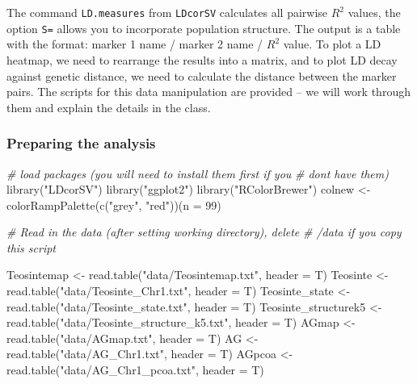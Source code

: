 \documentclass[
]{book}
\newenvironment{Shaded}{\begin{snugshade}}{\end{snugshade}}
\newcommand{\AttributeTok}[1]{\textcolor[rgb]{0.77,0.63,0.00}{#1}}
\newcommand{\CommentTok}[1]{\textcolor[rgb]{0.56,0.35,0.01}{\textit{#1}}}
\newcommand{\DecValTok}[1]{\textcolor[rgb]{0.00,0.00,0.81}{#1}}
\newcommand{\FunctionTok}[1]{\textcolor[rgb]{0.00,0.00,0.00}{#1}}
\newcommand{\NormalTok}[1]{#1}
\newcommand{\OtherTok}[1]{\textcolor[rgb]{0.56,0.35,0.01}{#1}}
\newcommand{\StringTok}[1]{\textcolor[rgb]{0.31,0.60,0.02}{#1}}
\begin{document}
The command \texttt{LD.measures} from \texttt{LDcorSV} calculates all pairwise \(R^2\) values, the option \texttt{S=} allows you to incorporate population structure. The output is a table with the format: marker 1 name / marker 2 name / \(R^2\) value. To plot a LD heatmap, we need to rearrange the results into a matrix, and to plot LD decay against genetic distance, we need to calculate the distance between the marker pairs. The scripts for this data manipulation are provided -- we will work through them and explain the details in the class.

\hypertarget{preparing-the-analysis}{%
\subsubsection{Preparing the analysis}\label{preparing-the-analysis}}

\begin{Shaded}
\begin{Highlighting}[]
\CommentTok{\# load packages (you will need to install them first if you}
\CommentTok{\# don\textquotesingle{}t have them)}
\FunctionTok{library}\NormalTok{(}\StringTok{"LDcorSV"}\NormalTok{)}
\FunctionTok{library}\NormalTok{(}\StringTok{"ggplot2"}\NormalTok{)}
\FunctionTok{library}\NormalTok{(}\StringTok{"RColorBrewer"}\NormalTok{)}
\NormalTok{colnew }\OtherTok{\textless{}{-}} \FunctionTok{colorRampPalette}\NormalTok{(}\FunctionTok{c}\NormalTok{(}\StringTok{"grey"}\NormalTok{, }\StringTok{"red"}\NormalTok{))(}\AttributeTok{n =} \DecValTok{99}\NormalTok{)}

\CommentTok{\# Read in the data (after setting working directory), delete}
\CommentTok{\# \textquotesingle{}/data\textquotesingle{} if you copy this script}

\NormalTok{Teosintemap }\OtherTok{\textless{}{-}} \FunctionTok{read.table}\NormalTok{(}\StringTok{"data/Teosintemap.txt"}\NormalTok{, }\AttributeTok{header =}\NormalTok{ T)}
\NormalTok{Teosinte }\OtherTok{\textless{}{-}} \FunctionTok{read.table}\NormalTok{(}\StringTok{"data/Teosinte\_Chr1.txt"}\NormalTok{, }\AttributeTok{header =}\NormalTok{ T)}
\NormalTok{Teosinte\_state }\OtherTok{\textless{}{-}} \FunctionTok{read.table}\NormalTok{(}\StringTok{"data/Teosinte\_state.txt"}\NormalTok{, }\AttributeTok{header =}\NormalTok{ T)}
\NormalTok{Teosinte\_structurek5 }\OtherTok{\textless{}{-}} \FunctionTok{read.table}\NormalTok{(}\StringTok{"data/Teosinte\_structure\_k5.txt"}\NormalTok{, }
    \AttributeTok{header =}\NormalTok{ T)}
\NormalTok{AGmap }\OtherTok{\textless{}{-}} \FunctionTok{read.table}\NormalTok{(}\StringTok{"data/AGmap.txt"}\NormalTok{, }\AttributeTok{header =}\NormalTok{ T)}
\NormalTok{AG }\OtherTok{\textless{}{-}} \FunctionTok{read.table}\NormalTok{(}\StringTok{"data/AG\_Chr1.txt"}\NormalTok{, }\AttributeTok{header =}\NormalTok{ T)}
\NormalTok{AGpcoa }\OtherTok{\textless{}{-}} \FunctionTok{read.table}\NormalTok{(}\StringTok{"data/AG\_Chr1\_pcoa.txt"}\NormalTok{, }\AttributeTok{header =}\NormalTok{ T)}
\end{Highlighting}
\end{Shaded}
\end{document}
